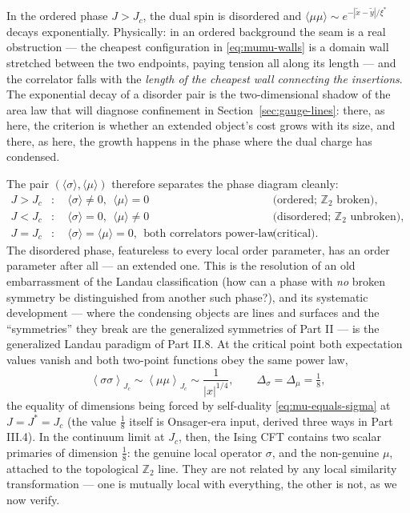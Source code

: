 In the ordered phase $J > J_c$, the dual spin is disordered and
$\langle\mu\mu\rangle \sim e^{-|\tilde x - \tilde y|/\xi^*}$ decays
exponentially. Physically: in an ordered background the seam is a real
obstruction --- the cheapest configuration in \eqref{eq:mumu-walls} is a
domain wall stretched between the two endpoints, paying tension all along
its length --- and the correlator falls with the \emph{length of the
cheapest wall connecting the insertions}. The exponential decay of a
disorder pair is the two-dimensional shadow of the area law that will
diagnose confinement in Section~\ref{sec:gauge-lines}: there, as here,
the criterion is whether an extended object's cost grows with its size,
and there, as here, the growth happens in the phase where the dual
charge has condensed.

The pair $(\langle\sigma\rangle, \langle\mu\rangle)$ therefore separates
the phase diagram cleanly:
\begin{equation}
\begin{aligned}
J > J_c &: \quad \langle\sigma\rangle \neq 0,\ \ \langle\mu\rangle = 0
&&\text{(ordered; $\mathbb{Z}_2$ broken)},\\
J < J_c &: \quad \langle\sigma\rangle = 0,\ \ \langle\mu\rangle \neq 0
&&\text{(disordered; $\mathbb{Z}_2$ unbroken)},\\
J = J_c &: \quad \langle\sigma\rangle = \langle\mu\rangle = 0,\ \
\text{both correlators power-law}
&&\text{(critical).}
\end{aligned}
\label{eq:phase-table}
\end{equation}
The disordered phase, featureless to every local order parameter, has an
order parameter after all --- an extended one. This is the resolution of
an old embarrassment of the Landau classification (how can a phase with
\emph{no} broken symmetry be distinguished from another such phase?), and
its systematic development --- where the condensing objects are lines and
surfaces and the ``symmetries'' they break are the generalized symmetries
of Part II --- is the generalized Landau paradigm of Part II.8. At the
critical point both expectation values vanish and both two-point
functions obey the same power law,
\begin{equation}
\left\langle \sigma\sigma \right\rangle_{J_c} \sim
\left\langle \mu\mu \right\rangle_{J_c} \sim \frac{1}{|x|^{1/4}},
\qquad \Delta_\sigma = \Delta_\mu = \tfrac18,
\label{eq:critical-sigma-mu}
\end{equation}
the equality of dimensions being forced by self-duality
\eqref{eq:mu-equals-sigma} at $J = J^* = J_c$ (the value $\frac18$ itself
is Onsager-era input, derived three ways in Part III.4). In the continuum
limit at $J_c$, then, the Ising CFT contains two scalar primaries of
dimension $\frac18$: the genuine local operator $\sigma$, and the
non-genuine $\mu$, attached to the topological $\mathbb{Z}_2$ line. They are not
related by any local similarity transformation --- one is mutually local
with everything, the other is not, as we now verify.

